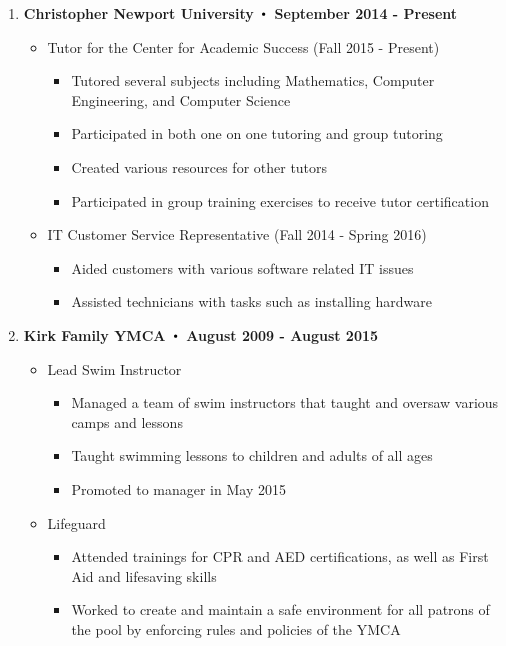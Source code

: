 \begin{enumerate}[label={\Roman*}.]
\item \textbf{Christopher Newport University $\Bigcdot$ September 2014 - Present}
\begin{itemize}
\item Tutor for the Center for Academic Success (Fall 2015 - Present)
\begin{itemize}
\item Tutored several subjects including Mathematics, Computer Engineering, and Computer Science
\item Participated in both one on one tutoring and group tutoring
\item Created various resources for other tutors
\item Participated in group training exercises to receive tutor certification 
\end{itemize}
\item IT Customer Service Representative (Fall 2014 - Spring 2016)
\begin{itemize}
\item Aided customers with various software related IT issues
\item Assisted technicians with tasks such as installing hardware
\end{itemize}
\end{itemize}

\newpage
\item \textbf{Kirk Family YMCA $\Bigcdot$ August 2009 - August 2015}
\begin{itemize}
\item Lead Swim Instructor
\begin{itemize}
\item Managed a team of swim instructors that taught and oversaw various camps and lessons
\item Taught swimming lessons to children and adults of all ages
\item Promoted to manager in May 2015
\end{itemize}
\item Lifeguard
\begin{itemize}
\item Attended trainings for CPR and AED certifications, as well as First Aid and lifesaving skills
\item Worked to create and maintain a safe environment for all patrons of the pool by enforcing rules and
policies of the YMCA
\end{itemize}
\end{itemize}
\end{enumerate}
